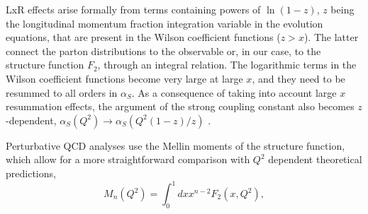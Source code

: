 \documentclass[
twocolumn,
aps,prd,
nofootinbib,
superscriptaddress,
showpacs,ligh
tightenlines, 
]{revtex4}
\begin{document}
LxR effects arise formally from terms containing powers of 
$\ln (1-z)$, $z$ being the longitudinal 
momentum fraction integration variable in the evolution equations, that are present in 
the Wilson coefficient functions ($z > x$). 
The latter connect the parton distributions to the observable or, in our case, 
to the structure function $F_2$, through an integral relation.
The logarithmic terms in the Wilson coefficient functions become very large at large $x$, and they need to be 
resummed to all orders in $\alpha_S$. 
As a consequence of taking into account large $x$ resummation effects, the argument of the strong coupling constant also becomes $z$-dependent, 
$\alpha_S(Q^2) \rightarrow \alpha_S(Q^2 (1-z)/z)$ \cite{Bianchi:2003hi,Courtoy:2013qca,Roberts:1999gb}. 

Perturbative QCD analyses use the 
Mellin moments of the structure function,
which allow for a more straightforward comparison with $Q^2$ dependent theoretical predictions, 
\begin{equation}
M_n(Q^2) = {\int_0^1} dx x^{n-2} F_2(x,Q^2),
\label{CN}
\end{equation}

\end{document}
